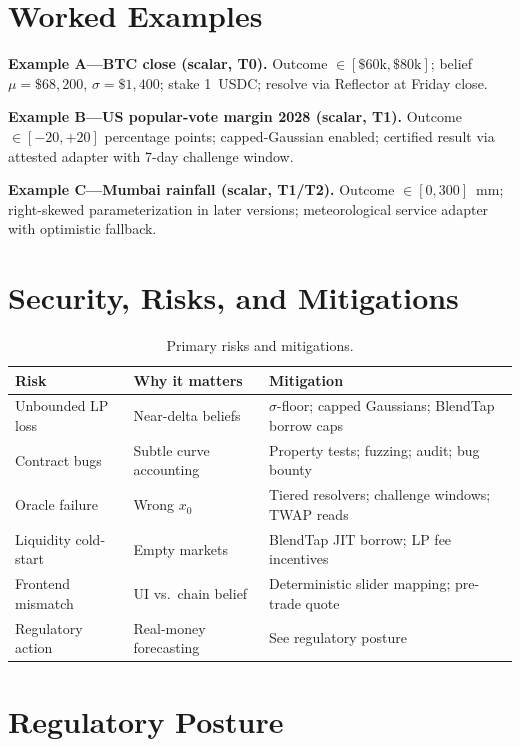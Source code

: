 \documentclass{portalciencia}
\begin{document}
\section{Worked Examples}

\textbf{Example A---BTC close (scalar, T0).} Outcome $\in [\$60\text{k}, \$80\text{k}]$; belief $\mu=\$68{,}200$, $\sigma=\$1{,}400$; stake 1~USDC; resolve via Reflector at Friday close.

\textbf{Example B---US popular-vote margin 2028 (scalar, T1).} Outcome $\in [-20, +20]$ percentage points; capped-Gaussian enabled; certified result via attested adapter with 7-day challenge window.

\textbf{Example C---Mumbai rainfall (scalar, T1/T2).} Outcome $\in [0, 300]$~mm; right-skewed parameterization in later versions; meteorological service adapter with optimistic fallback.

\section{Security, Risks, and Mitigations}

\begin{table}[ht]
\centering
\caption{Primary risks and mitigations.}
\label{tab:risks}
\begin{tabular}{p{3cm}p{4cm}p{5cm}}
\toprule
Risk & Why it matters & Mitigation \\
\midrule
Unbounded LP loss & Near-delta beliefs & $\sigma$-floor; capped Gaussians; BlendTap borrow caps \\
Contract bugs & Subtle curve accounting & Property tests; fuzzing; audit; bug bounty \\
Oracle failure & Wrong $x_0$ & Tiered resolvers; challenge windows; TWAP reads \\
Liquidity cold-start & Empty markets & BlendTap JIT borrow; LP fee incentives \\
Frontend mismatch & UI vs.\ chain belief & Deterministic slider mapping; pre-trade quote \\
Regulatory action & Real-money forecasting & See regulatory posture \\
\bottomrule
\end{tabular}
\end{table}

\section{Regulatory Posture}
\end{document}
